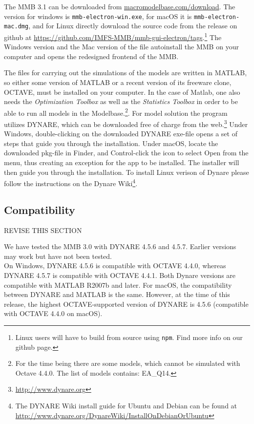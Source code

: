The MMB 3.1 can be downloaded from \url{macromodelbase.com/download}. The version for windows is \texttt{mmb-electron-win.exe}, for macOS it is \texttt{mmb-electron-mac.dmg}, and for Linux directly download the source code from the release on github at
\url{https://github.com/IMFS-MMB/mmb-gui-electron/tags}.\footnote{Linux users will have to build from source using \texttt{npm}. Find more info on our github page.}
The Windows version and the Mac version of the file autoinstall the MMB on your computer and opens the redesigned frontend of the MMB. 

The files for carrying out the simulations of the models are written in MATLAB, so either some version of MATLAB or a recent version of its freeware clone, OCTAVE, must be installed on your computer. In the case of Matlab, one also needs the \textit{Optimization Toolbox} as well as the \textit{Statistics Toolbox} in order to be able to run all models in the Modelbase.\footnote{For the time being there are some models, which cannot be simulated with Octave 4.4.0. The list of models contains: EA\_Q14.}.
For model solution the program utilizes DYNARE, which can be downloaded free of charge from the web.\footnote{\url{http://www.dynare.org}} Under Windows, double-clicking on the downloaded DYNARE exe-file opens a set of steps that guide you through the installation. Under macOS, locate the downloaded pkg-file in Finder, and Control-click the icon to select Open from the menu, thus creating an exception for the app to be installed. The installer will then guide you through the installation. To install Linux verison of Dynare please follow the instructions on the Dynare Wiki\footnote{The DYNARE Wiki install guide for Ubuntu and Debian can be found at \url{http://www.dynare.org/DynareWiki/InstallOnDebianOrUbuntu}}.

\subsection*{Compatibility}

REVISE THIS SECTION

We have tested the MMB 3.0 with DYNARE 4.5.6 and 4.5.7. Earlier versions may work but have not been tested.\\
On Windows, DYNARE 4.5.6 is compatible with OCTAVE 4.4.0, whereas DYNARE 4.5.7 is compatible with OCTAVE 4.4.1. Both Dynare versions are compatible with  MATLAB R2007b and later. For macOS, the compatibility between DYNARE and MATLAB is the same. However, at the time of this release, the highest OCTAVE-supported version of DYNARE is 4.5.6 (compatible with OCTAVE 4.4.0 on macOS).\\


